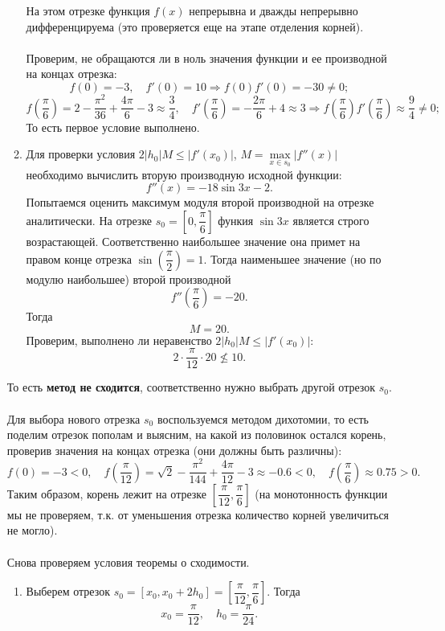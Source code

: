 \documentclass[a4paper, 12pt]{article}
\renewcommand{\leq}{\leqslant}
\begin{document}
\begin{enumerate}
\begin{enumerate}
			На этом отрезке функция $f(x)$ непрерывна и дважды непрерывно дифференцируема (это проверяется еще на этапе отделения корней).\\\\
			Проверим, не обращаются ли в ноль значения функции и ее производной на концах отрезка:
			$$f(0) = -3,\quad f'(0) = 10\Rightarrow f(0)f'(0) = -30\ne 0;$$
			$$f\left(\dfrac\pi6\right) = 2-\dfrac{\pi^2}{36} + \dfrac{4\pi}{6} - 3\approx \dfrac34,\quad f'\left(\dfrac\pi6\right) = -\dfrac{2\pi}{6} + 4\approx 3\Rightarrow f\left(\dfrac\pi6\right)f'\left(\dfrac\pi6\right) \approx \dfrac94\ne 0;$$
			То есть первое условие выполнено.
			\item Для проверки условия $2|h_0|M \leq |f'(x_0)|$, $M = \underset{x\in s_0}{\max}|f''(x)|$ необходимо вычислить вторую производную исходной функции:
			$$f''(x) = -18\sin 3x - 2.$$
			Попытаемся оценить максимум модуля второй производной на отрезке аналитически. На отрезке $s_0 = \left[0, \dfrac\pi6\right]$ функия $\sin3x$ является строго возрастающей. Соответственно наибольшее значение она примет на правом конце отрезка $\sin \left(\dfrac\pi2\right) =1$. Тогда наименьшее значение (но по модулю наибольшее) второй производной $$f''\left(\dfrac\pi6\right)=-20.$$
			Тогда $$M = 20.$$
			Проверим, выполнено ли неравенство $2|h_0|M \leq |f'(x_0)|$:
			$$2\cdot \dfrac{\pi}{12} \cdot 20 \not\leq 10.$$
		\end{enumerate}
		То есть \textbf{метод не сходится}, соответственно нужно выбрать другой отрезок $s_0$.\\\\
		Для выбора нового отрезка $s_0$ воспользуемся методом дихотомии, то есть поделим отрезок пополам и выясним, на какой из половинок остался корень, проверив значения на концах отрезка (они должны быть различны):
		$$f(0) = -3 < 0,\quad f\left(\dfrac{\pi}{12}\right) = \sqrt2 - \dfrac{\pi^2}{144} + \dfrac{4\pi}{12} -3\approx -0.6 < 0,\quad f\left(\dfrac{\pi}{6}\right)\approx 0.75 > 0.$$
		Таким образом, корень лежит на отрезке $\left[\dfrac{\pi}{12}, \dfrac{\pi}{6}\right]$ (на монотонность функции мы не проверяем, т.к. от уменьшения отрезка количество корней увеличиться не могло).\\\\
		Снова проверяем условия теоремы о сходимости.
		\begin{enumerate}
			\item Выберем отрезок $s_0 = [x_0, x_0 + 2h_0] = \left[\dfrac{\pi}{12}, \dfrac{\pi}{6}\right]$. Тогда $$x_0 = \dfrac{\pi}{12},\quad h_0 = \dfrac{\pi }{24}.$$

\end{enumerate}
\end{enumerate}
\end{document}
